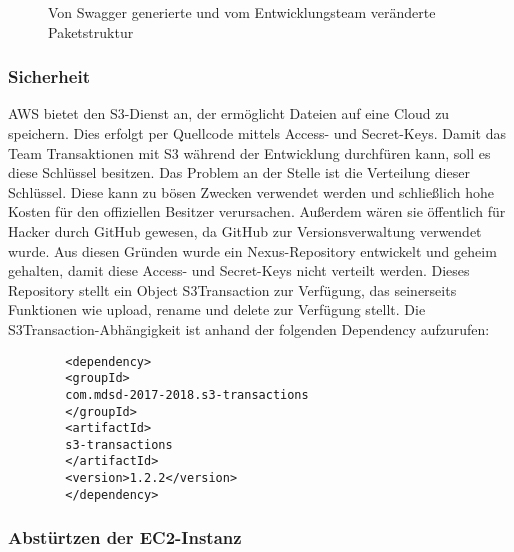 \documentclass[a4paper,twoside]{article}
\begin{document}
	\begin{figure}[ht]
		\centering
		{}
		\caption{Von Swagger generierte und vom Entwicklungsteam ver\"anderte Paketstruktur}
		\label{fig:von-swagger-generierte-paketstruktur}
	\end{figure}
	
	\subsubsection{Sicherheit}
	
	AWS bietet den S3-Dienst an, der erm\"oglicht Dateien auf eine Cloud zu speichern. Dies erfolgt per Quellcode mittels Access- und Secret-Keys. Damit das Team Transaktionen mit S3 w\"ahrend der Entwicklung durchf\"uren kann, soll es diese Schl\"ussel besitzen. Das Problem an der Stelle ist die Verteilung dieser Schl\"ussel. Diese kann zu b\"osen Zwecken verwendet werden und schlie\ss{}lich hohe Kosten f\"ur den offiziellen Besitzer verursachen. Au\ss{}erdem w\"aren sie \"offentlich f\"ur Hacker durch GitHub gewesen, da GitHub zur Versionsverwaltung verwendet wurde.
	Aus diesen Gr\"unden wurde ein Nexus-Repository entwickelt und geheim gehalten, damit diese Access- und Secret-Keys nicht verteilt werden. Dieses Repository stellt ein Object S3Transaction zur Verf\"ugung, das seinerseits Funktionen wie upload, rename und delete zur Verf\"ugung stellt. Die S3Transaction-Abh\"angigkeit ist anhand der folgenden Dependency aufzurufen:
	
	\begin{small}
		\begin{verbatim}
		<dependency>
		<groupId>
		com.mdsd-2017-2018.s3-transactions
		</groupId>
		<artifactId>
		s3-transactions
		</artifactId>
		<version>1.2.2</version>
		</dependency>
		\end{verbatim}
	\end{small}

	\subsubsection{Abst\"urtzen der EC2-Instanz}
	
	\vfill
	
	{\small
		}
	
	\listoftables
	
	\listoffigures
\end{document}
